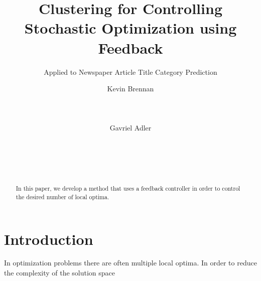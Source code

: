 \documentclass{sig-alternate}
\begin{document}
%

\title{Clustering for Controlling Stochastic Optimization using Feedback}
\subtitle{Applied to Newspaper Article Title Category Prediction}

\author{
\alignauthor
Kevin Brennan\\
       \\
       \\
       \\
\alignauthor
Gavriel Adler\\
       \\
       \\
       \\
       \\
}


\maketitle
\begin{abstract}
In this paper, we develop a method that uses a feedback controller in order to control the desired number
of local optima.
\end{abstract}




\section{Introduction}
In optimization problems there are often multiple local optima. In order to reduce the complexity of the solution space
\end{document}
